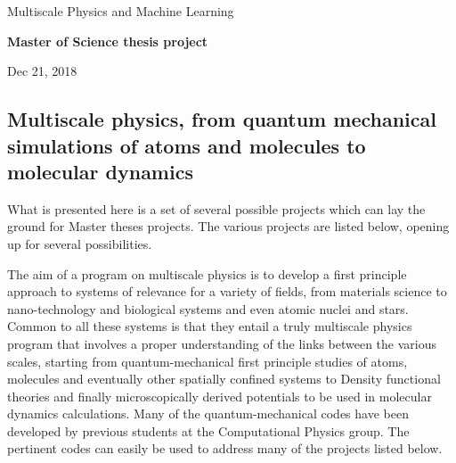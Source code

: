 \documentclass[%
oneside,                 %
final,                   %
10pt]{article}
\begin{document}

\newcommand{\exercisesection}[1]{\subsection*{#1}}






\thispagestyle{empty}

\begin{center}
{\LARGE\bf
\begin{spacing}{1.25}
Multiscale Physics and Machine Learning
\end{spacing}
}
\end{center}


\begin{center}
{\bf Master of Science thesis project${}^{}$} \\ [0mm]
\end{center}

\begin{center}
\end{center}
    

\begin{center}
Dec 21, 2018
\end{center}

\vspace{1cm}


\subsection*{Multiscale physics, from quantum mechanical simulations of atoms and molecules to molecular dynamics}

What is presented here is a set of several possible  projects which can lay the ground for 
Master theses projects.  The various projects are listed below,
opening up for several possibilities.

The aim of a program on multiscale physics is to develop a first
principle approach to systems of relevance for a variety of fields,
from materials science to nano-technology and biological systems and
even atomic nuclei and stars.  Common to all these systems is that
they entail a truly multiscale physics program that involves a proper
understanding of the links between the various scales, starting from
quantum-mechanical first principle studies of atoms, molecules and
eventually other spatially confined systems to Density functional
theories and finally microscopically derived potentials to be used in
molecular dynamics calculations. Many of the quantum-mechanical codes have been developed by previous 
students at the Computational Physics group. The pertinent codes can easily be used to address many of the projects listed below.
\end{document}
